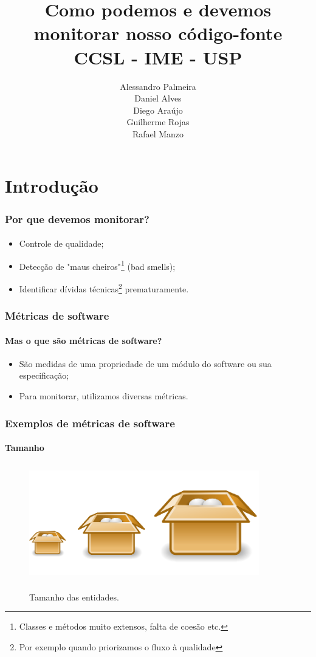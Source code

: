 \documentclass{beamer}
\title{
       \textbf{Como podemos e devemos monitorar nosso código-fonte} \\
       CCSL - IME - USP
      }
\author{
        Alessandro Palmeira \\
        Daniel Alves \\
        Diego Araújo \\
        Guilherme Rojas \\
        Rafael Manzo
       }
\begin{document}
\maketitle

\section{Introdução}

\begin{frame}
  \frametitle{Por que devemos monitorar?}
  \framesubtitle{}

  \begin{itemize}
    \item Controle de qualidade;
    \item Detecção de "maus cheiros"\footnote{Classes e métodos muito extensos, falta de coesão etc.} (bad smells);
    \item Identificar dívidas técnicas\footnote{Por exemplo quando priorizamos o fluxo à qualidade} prematuramente.
  \end{itemize}

\end{frame}

\begin{frame}
  \frametitle{Métricas de software}
  \framesubtitle{Mas o que são métricas de software?}

\begin{itemize}
  \item São medidas de uma propriedade de um módulo do software ou sua especificação;
  \item Para monitorar, utilizamos diversas métricas.
\end{itemize}

\end{frame}

\begin{frame}
  \frametitle{Exemplos de métricas de software}
  \framesubtitle{Tamanho}

  \begin{figure}
    \begin{center}
      \includegraphics[width=10cm, height=5cm]{images/size.png}
      \label{fig: size}
      \caption{Tamanho das entidades.}
    \end{center}
  \end{figure}
\end{frame}
\end{document}
